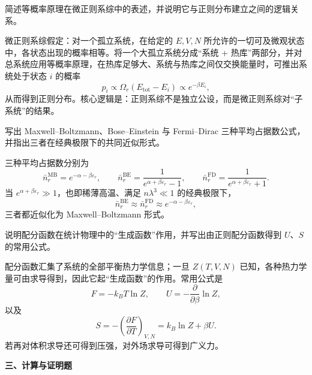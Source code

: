 \begin{question}
简述等概率原理在微正则系综中的表述，并说明它与正则分布建立之间的逻辑关系。

\begin{solution}
微正则系综假定：对一个孤立系统，在给定的 $E,V,N$ 所允许的一切可及微观状态中，各状态出现的概率相等。将一个大孤立系统分成“系统 + 热库”两部分，并对总系统应用等概率原理，在热库足够大、系统与热库之间仅交换能量时，可推出系统处于状态 $i$ 的概率
\[
p_i \propto \Omega_r(E_{\text{tot}}-E_i)\propto e^{-\beta E_i},
\]
从而得到正则分布。核心逻辑是：正则系综不是独立公设，而是微正则系综对“子系统”的结果。
\end{solution}
\end{question}
\begin{question}
写出 Maxwell--Boltzmann、Bose--Einstein 与 Fermi--Dirac 三种平均占据数公式，并指出三者在经典极限下的共同近似形式。

\begin{solution}
三种平均占据数分别为
\[
\bar n_r^{\mathrm{MB}} = e^{-\alpha-\beta\varepsilon_r},
\qquad
\bar n_r^{\mathrm{BE}} = \frac{1}{e^{\alpha+\beta\varepsilon_r}-1},
\qquad
\bar n_r^{\mathrm{FD}} = \frac{1}{e^{\alpha+\beta\varepsilon_r}+1}.
\]
当 $e^{\alpha+\beta\varepsilon_r}\gg 1$，也即稀薄高温、满足 $n\lambda^3\ll 1$ 的经典极限下，
\[
\bar n_r^{\mathrm{BE}}\approx \bar n_r^{\mathrm{FD}}
\approx e^{-\alpha-\beta\varepsilon_r},
\]
三者都近似化为 Maxwell--Boltzmann 形式。
\end{solution}
\end{question}
\begin{question}
说明配分函数在统计物理中的“生成函数”作用，并写出由正则配分函数得到 $U$、$S$ 的常用公式。

\begin{solution}
配分函数汇集了系统的全部平衡热力学信息；一旦 $Z(T,V,N)$ 已知，各种热力学量可由求导得到，因此它起“生成函数”的作用。常用公式是
\[
F=-k_B T\ln Z,
\qquad
U=-\frac{\partial}{\partial \beta}\ln Z,
\]
以及
\[
S=-\left(\frac{\partial F}{\partial T}\right)_{V,N}
= k_B\ln Z + \beta U.
\]
若再对体积求导还可得到压强，对外场求导可得到广义力。
\end{solution}
\end{question}
\textbf{三、计算与证明题}

